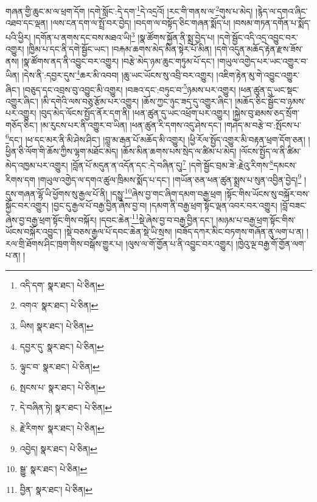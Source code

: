 གཞན་གྱི་ཆུང་མ་ལ་ཕྲག་དོག །དགེ་སློང་:དེ་དག་\footnote{འདི་དག་  སྣར་ཐང་།  པེ་ཅིན། }དེ་འདྲའོ། །རང་གི་གནས་ལ་\footnote{འགའ་  སྣར་ཐང་།  པེ་ཅིན། }གུས་པ་མེད། །རྙེད་ལ་དགའ་ཞིང་འཐབ་དང་ལྡན། །ལས་ངན་དག་ལ་སྤྲོ་བར་བྱེད། །བདག་ལ་བསྟོད་ཅིང་གཞན་སྨོད་པ། །བསམ་གཏན་དགོན་པ་སྨོད་པའི་ཕྱིར། །དགོན་པ་ནགས་དང་བས་མཐའ་ཡི།\footnote{ཡིས།  སྣར་ཐང་།  པེ་ཅིན། } །སྣ་ཚོགས་སྐྱོན་ནི་སྨྲ་བྱེད་པ། །དགེ་སྦྱོང་འདི་འདྲ་འབྱུང་བར་འགྱུར། །ཁྱིམ་པ་དང་ནི་དགེ་སྦྱོང་ཡང་། །བརྐམ་ཆགས་མེད་མིན་སྟེར་པོ་མིན། །དགེ་འདུན་མཆོད་རྟེན་རྫས་ཟོས་ནས། །སྣ་ཚོགས་ནད་ནི་འབྱུང་བར་འགྱུར། །བརྩེ་མེད་ཉམ་ཆུང་གཏུམ་པོ་དང་། །གཡུལ་འགྱེད་པར་ཡང་འགྱུར་བ་ཡིན། །དེས་ནི་:དབྱར་དུས་\footnote{དབྱར་དུ་  སྣར་ཐང་།  པེ་ཅིན། }ཆར་མི་འབབ། །ཆུ་ཡང་ཡོངས་སུ་འབྲི་བར་འགྱུར། །འཇིག་རྟེན་མུ་གེ་འབྱུང་འགྱུར་ཞིང་། །བཅུད་དང་འབྲས་བུ་འབྱུང་མི་འགྱུར། །བཟའ་དང་:བཏུང་བ་\footnote{ལྟུང་བ་  སྣར་ཐང་།  པེ་ཅིན། }ཉམས་པར་འགྱུར། །ཕན་ཚུན་དུ་ཡང་སྡང་འགྱུར་ཞིང་། །མི་དགེའི་ལས་བཅུ་རྩོམ་པར་འགྱུར། །ཆོས་ཀྱང་ཉུང་ཟད་དུ་འགྱུར་ཞིང་། །མཆོད་ཅིང་སྦྱོང་བ་ཉམས་པར་འགྱུར། །བུད་མེད་ལོངས་སྤྱོད་ནོར་དག་ནི། །ཕན་ཚུན་དུ་ཡང་འཕྲོག་པར་འགྱུར། །སྐྱེས་བུ་ཐམས་ཅད་སྲོག་གཅོད་ཅིང་། །མ་རུངས་པར་ནི་འགྱུར་བ་ཡིན། །ཕན་ཚུན་རི་དགས་འདུ་ཤེས་དང་། །གཤེད་མ་བརྩེ་བ་:སྤོངས་པ་\footnote{སྤངས་པ་  སྣར་ཐང་།  པེ་ཅིན། }དང་། །ཕ་དང་མར་ནི་མི་ཤེས་ཤིང་། །བླ་མ་རྒན་པོ་མཆོད་མི་འགྱུར། །ཕྱི་རོལ་སྤྱོད་འགྱུར་མི་བརྟན་ཕྲག་དོག་ཅན། །ཕྱིན་ཅི་ལོག་གི་ཆོས་ཀྱིས་ལྷག་མཐོང་མེད། །ཆོས་མིན་ཆགས་པས་སྲེད་ལ་ཚིམ་པ་མེད། །ལོངས་སྤྱོད་ལ་ནི་ཚིམ་མེད་འཁྱམ་པར་འགྱུར། །བློན་པོ་མདུན་ན་འདོན་དང་:དེ་བཞིན་དུ།\footnote{དེ་བཞིན་ཏེ།  སྣར་ཐང་།  པེ་ཅིན། } །དགེ་སྦྱོང་བྲམ་ཟེ་:རྗེའུ་རིགས་\footnote{རྗེ་རིགས་  སྣར་ཐང་།  པེ་ཅིན། }དམངས་རིགས་དག །གཡུལ་འགྱེད་ལ་དགའ་ཚུལ་ཁྲིམས་སྨོད་པ་དང་། །གཡོན་ཅན་ཕན་ཚུན་སྨྲས་པ་སུན་འབྱིན་བྱེད།\footnote{འབྱེད།  སྣར་ཐང་།  པེ་ཅིན། } །དུས་གཞན་ལྷོ་ཡི་ཕྱོགས་སུ་རྒྱལ་པོ་ནི། །དསྱུ་\footnote{སྒྱུ་  སྣར་ཐང་།  པེ་ཅིན། }ཞེས་བྱ་གང་ཞིག་དམག་བརྒྱ་ཕྲག །སྟོང་གིས་ཡོངས་སུ་བསྐོར་བས་སྐྱོང་བར་འགྱུར། །བྱང་དུ་རྒྱལ་པོ་བརྒྱ་བྱིན་ཞེས་བྱ་བ། །དམག་ནི་བརྒྱ་ཕྲག་སྟོང་ལྡན་འབར་བར་འགྱུར། །བློ་བཟང་ཞེས་བྱ་བརྒྱ་ཕྲག་སྟོང་གིས་བསྐོར། །དབང་ཆེན་\footnote{བྱིན་  སྣར་ཐང་།  པེ་ཅིན། }སྡེ་ཞེས་བྱ་བ་བརྒྱ་བྱིན་དང་། །མཉམ་པ་བརྒྱ་ཕྲག་སྟོང་གིས་ཡོངས་བསྐོར་འབྱུང་། །སྡེ་བཅས་རྒྱལ་པོ་དབང་ཆེན་སྡེ་ཡི་སྲས། །བཟོད་དཀར་མིང་བཏགས་གཞོན་ནུ་ལག་པ་ན། །རལ་གྲི་ཐོགས་ཤིང་ཁྲག་གིས་བསྒོས་གྱུར་པ། །ལུས་ལ་གོ་གྱོན་པ་ནི་འབྱུང་བར་འགྱུར། །ཁྱེའུ་ལྔ་བརྒྱ་གོ་གྱོན་ལག་པ་ན། །
